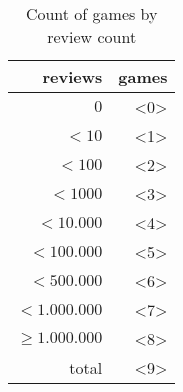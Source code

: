 \begin{table}[h]
    \centering
    \begin{tabular}{r|r}
reviews             & games \\\hline
    $0$             & <0>\\
    $< 10$          & <1>\\
    $< 100$         & <2>\\
    $< 1000$        & <3>\\
    $< 10.000$      & <4>\\
    $< 100.000$     & <5>\\
    $< 500.000$     & <6>\\
    $< 1.000.000$   & <7>\\
    $\geq1.000.000$    & <8>\\\hline
    total           & <9>
\end{tabular}
    \caption{Count of games by review count}
    \label{tab:game_metrics}
\end{table}